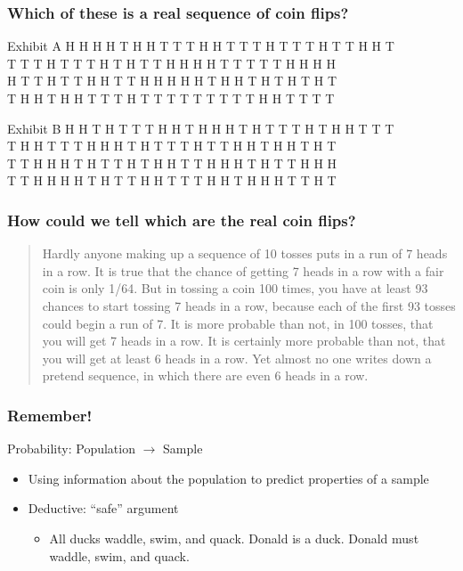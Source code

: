 \documentclass{beamer}
\begin{document}
\begin{frame}
\frametitle{Which of these is a real sequence of coin flips?}
	\small
	\begin{block}{Exhibit A}
	H H H H T H H T T T H H T T T H T T T H T T H H T \\
	T T T H T T T H T H T T H H H H T T T T T H H H H \\
	H T T H T T H H T T H H H H H T H H T H T H T H T \\
	T H H T H H T T T H T T T T T T T T T H H T T T T 
	\end{block}
	
	\begin{block}{Exhibit B}
	H H T H T T T H H T H H H T H T T T H T H H T T T\\
	T H H T T T H H H T H T T T H T T H H T H H T H T\\
	T T H H H T H T T H T H H T	T H H H T H T T H H H\\
	T T H H H H T H T T H H T T T H H T H H H T T H T
	\end{block}
\end{frame}

\begin{frame}
\frametitle{How could we tell which are the real coin flips?}
    \begin{quote}
	Hardly anyone making up a sequence of 10 tosses puts in a run of 7 heads in a row. It is true that 
	the chance of getting 7 heads in a row with a fair coin is only 1/64. But in tossing a coin 100 times, 
	you have at least 93 chances to start tossing 7 heads in a row, because \alert{each of the first 93 
	tosses could begin a run of 7.} It is more probable than not, in 100 tosses, that you will get 7 
	heads in a row. It is certainly more probable than not, that you will get at least 6 heads in a row. 
	Yet almost no one writes down a pretend sequence, in which there are even 6 heads in a row.
	\end{quote}
\end{frame}

\begin{frame}
\frametitle{Remember!}
    Probability: Population $\rightarrow$ Sample
	\begin{itemize}
	    \item Using information about the population to predict properties of a sample
		\item Deductive: ``safe'' argument
		\begin{itemize}
        		\item All ducks waddle, swim, and quack. Donald is a duck. Donald must 								
		    waddle, swim, and quack.
		\end{itemize}
	\end{itemize}
\end{frame}
\end{document}
